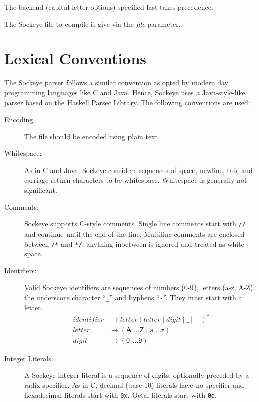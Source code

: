 \documentclass[a4paper,11pt,twoside]{report}
\begin{document}
{{The backend (capital letter options) specified last takes precedence.

The Sockeye file to compile is give via the \textit{file} parameter.


\chapter{Lexical Conventions}
\label{chap:lexer}

The Sockeye parser follows a similar convention as opted by modern day 
programming languages like C and Java. Hence, Sockeye uses a Java-style-like
parser based on the Haskell Parsec Library. The following conventions are used:

\begin{description}
\item[Encoding] The file should be encoded using plain text.
\item[Whitespace:]  As in C and Java, Sockeye considers sequences of
  space, newline, tab, and carriage return characters to be
  whitespace.  Whitespace is generally not significant. 

\item[Comments:] Sockeye supports C-style comments.  Single line comments
  start with \texttt{//} and continue until the end of the line.
  Multiline comments are enclosed between \texttt{/*} and \texttt{*/};
  anything inbetween is ignored and treated as white space.

\item[Identifiers:] Valid Sockeye identifiers are sequences of numbers
  (0-9), letters (a-z, A-Z), the underscore character ``\texttt{\_}'' and hyphens ``\texttt{-}''. They
  must start with a letter.
  \begin{align*}
  identifier & \rightarrow letter (letter \mid digit \mid \_ \mid -)^{\textrm{*}} \\
  letter & \rightarrow (\textsf{A \ldots Z} \mid  \textsf{a \ldots z})\\
  digit & \rightarrow (\textsf{0 \ldots 9})
	\end{align*}
  
\item[Integer Literals:] A Sockeye integer literal is a sequence of
  digits, optionally preceded by a radix specifier.  As in C, decimal (base 10)
  literals have no specifier and hexadecimal literals start with
  \texttt{0x}. Octal literals start with \texttt{0o}.


\end{description}}}
\end{document}
